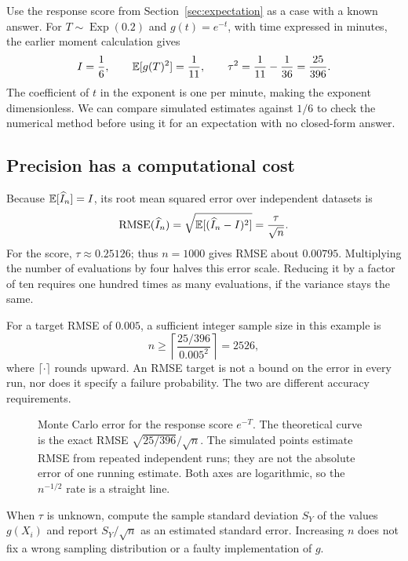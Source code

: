 Use the response score from Section~\ref{sec:expectation} as a case
with a known answer. For \(T\sim\operatorname{Exp}(0.2)\) and
\(g(t)=e^{-t}\), with time expressed in minutes, the earlier moment
calculation gives
\[
  I=\frac16,\qquad
  \mathbb{E}[g(T)^2]=\frac1{11},\qquad
  \tau^2=\frac1{11}-\frac1{36}=\frac{25}{396}.
\]
The coefficient of \(t\) in the exponent is one per minute, making
the exponent dimensionless. We can compare simulated estimates
against \(1/6\) to check the numerical method before using it for
an expectation with no closed-form answer.

\subsection{Precision has a computational cost}

Because \(\mathbb{E}[\widehat I_n]=I\), its root mean squared error over
independent datasets is
\begin{equation}
  \operatorname{RMSE}(\widehat I_n)
  =\sqrt{\mathbb{E}[(\widehat I_n-I)^2]}
  =\frac{\tau}{\sqrt n}.
  \label{eq:mc-rmse}
\end{equation}
For the score, \(\tau\approx0.25126\); thus \(n=1000\) gives
RMSE about \(0.00795\). Multiplying the number of evaluations by
four halves this error scale. Reducing it by a factor of ten requires
one hundred times as many evaluations, if the variance stays the same.

For a target RMSE of \(0.005\), a sufficient integer sample size in
this example is
\[
  n\ge\left\lceil\frac{25/396}{0.005^2}\right\rceil=2526,
\]
where \(\lceil\cdot\rceil\) rounds upward. An RMSE target is not a
bound on the error in every run, nor does it specify a failure
probability. The two are different accuracy requirements.

\begin{figure}[H]
  \centering
  
  \caption{Monte Carlo error for the response score \(e^{-T}\).
  The theoretical curve is the exact RMSE \(\sqrt{25/396}/\sqrt n\).
  The simulated points estimate RMSE from repeated independent runs;
  they are not the absolute error of one running estimate. Both axes
  are logarithmic, so the \(n^{-1/2}\) rate is a straight line.}
  \label{fig:ch4-monte-carlo}
\end{figure}

When \(\tau\) is unknown, compute the sample standard deviation
\(S_Y\) of the values \(g(X_i)\) and report \(S_Y/\sqrt n\) as an
estimated standard error. Increasing \(n\) does not fix a wrong
sampling distribution or a faulty implementation of \(g\).

